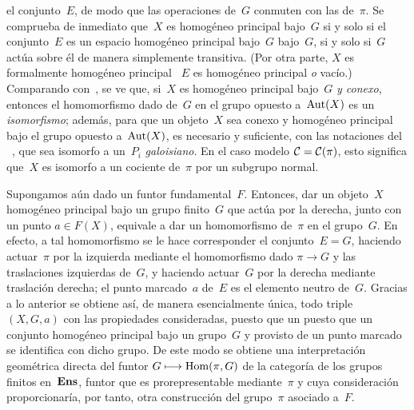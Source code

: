 \begin{remarque}
el conjunto~$E$, de modo que las operaciones de~$G$ conmuten con las
de~$\pi$. Se comprueba de inmediato que~$X$ es homogéneo principal bajo~$G$
si y solo si el conjunto~$E$ es un espacio homogéneo principal
{bajo~$G$}
{bajo~$G$,}
\ie si y solo si~$G$ actúa sobre él de manera simplemente transitiva. (Por
otra parte, $X$ es formalmente homogéneo principal \sss\ 
$E$ es homogéneo principal \emph{o} vacío.) Comparando con~, se
ve que, si~$X$ es homogéneo principal bajo~$G$ \emph{y conexo}, entonces el
homomorfismo dado de~$G$ en el grupo opuesto a~$\Aut(X)$ es un
\emph{isomorfismo}; además, para que un objeto~$X$
sea conexo y homogéneo principal bajo el grupo opuesto a~$\Aut(X)$, es
necesario y suficiente, con las notaciones del \No~\Ref{V.4}, que sea
isomorfo a un~$P_i$ \emph{galoisiano}. En el caso modelo
$\cal{C}=\cal{C}(\pi)$, esto significa que~$X$ es isomorfo a un cociente
de~$\pi$ por un subgrupo normal.

Supongamos aún dado un funtor fundamental~$F$. Entonces, dar un
objeto~$X$ homogéneo principal bajo un grupo finito~$G$ que actúa por la
derecha, junto con un punto $a\in F(X)$, equivale a dar un homomorfismo
de~$\pi$ en el grupo~$G$. En efecto, a tal homomorfismo se le hace
corresponder el conjunto~$E=G$, haciendo actuar~$\pi$ por la izquierda
mediante el homomorfismo dado $\pi\to G$ y las traslaciones izquierdas
de~$G$, y haciendo actuar~$G$ por la derecha mediante traslación derecha;
el punto marcado~$a$ de~$E$ es el elemento neutro de~$G$. Gracias a lo
anterior se obtiene así, de manera esencialmente única, todo triple
$(X,G,a)$ con las propiedades consideradas,
{puesto que un}
{puesto que un}
conjunto homogéneo principal bajo un grupo~$G$ y provisto de un punto
marcado se identifica con dicho grupo. De este modo se obtiene una
interpretación geométrica directa del funtor $G\mto\Hom(\pi,G)$ de la
categoría de los grupos finitos en~$\Ens$, funtor que es prorepresentable
mediante~$\pi$ y cuya consideración proporcionaría, por tanto, otra
construcción del grupo~$\pi$ asociado a~$F$.
\end{remarque}
